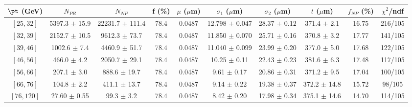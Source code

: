 \begin{tabular}{c||c|c|c|c|c|c|c||c|c}
$\pt$ (GeV) & $N_{PR}$ & $N_{NP}$ & f (\%) & $\mu$ ($\mu$m) & $\sigma_1$ ($\mu$m) & $\sigma_2$ ($\mu$m)  & $t$ ($\mu$m) & $f_{NP}$ (\%) & $\chi^2$/ndf \\
\hline
$[25, 32]$ & 5397.3 $\pm$ 15.9 & 22231.7 $\pm$ 111.4 & 78.4 & 0.0487 & 12.798 $\pm$ 0.047 & 28.37 $\pm$ 0.12 & 371.4 $\pm$ 2.1 & 16.75 & 216/105\\
$[32, 39]$ & 2152.7 $\pm$ 10.5 & 9612.3 $\pm$ 73.7 & 78.4 & 0.0487 & 11.850 $\pm$ 0.070 & 25.71 $\pm$ 0.16 & 370.8 $\pm$ 3.2 & 17.77 & 141/105\\
$[39, 46]$ & 1002.6 $\pm$ 7.4 & 4460.9 $\pm$ 51.7 & 78.4 & 0.0487 & 11.040 $\pm$ 0.099 & 23.99 $\pm$ 0.20 & 377.0 $\pm$ 5.0 & 17.68 & 122/105\\
$[46, 56]$ & 466.0 $\pm$ 4.2 & 2050.7 $\pm$ 29.1 & 78.4 & 0.0487 & 10.25 $\pm$ 0.11 & 22.43 $\pm$ 0.23 & 381.6 $\pm$ 6.3 & 17.48 & 117/105\\
$[56, 66]$ & 207.1 $\pm$ 3.0 & 888.6 $\pm$ 19.7 & 78.4 & 0.0487 & 9.61 $\pm$ 0.17 & 20.86 $\pm$ 0.31 & 371.2 $\pm$ 9.5 & 17.04 & 100/105\\
$[66, 76]$ & 104.8 $\pm$ 2.2 & 411.1 $\pm$ 13.7 & 78.4 & 0.0487 & 9.14 $\pm$ 0.22 & 19.38 $\pm$ 0.37 & 372.2 $\pm$ 14.8 & 15.72 & 98/105\\
$[76, 120]$ & 27.60 $\pm$ 0.55 & 99.3 $\pm$ 3.2 & 78.4 & 0.0487 & 8.42 $\pm$ 0.20 & 17.98 $\pm$ 0.34 & 375.1 $\pm$ 14.6 & 14.70 & 114/105\\
\end{tabular}
